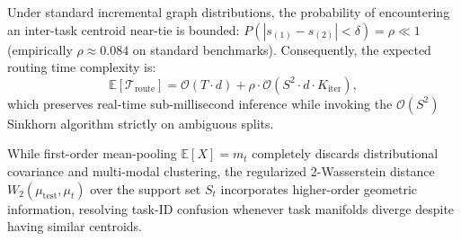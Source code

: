 \begin{remark}
Under standard incremental graph distributions, the probability of encountering an inter-task centroid near-tie is bounded: $P(|s_{(1)} - s_{(2)}| < \delta) = \rho \ll 1$ (empirically $\rho \approx 0.084$ on standard benchmarks). Consequently, the expected routing time complexity is:
\begin{equation}
    \mathbb{E}[\mathcal{T}_{\mathrm{route}}] = \mathcal{O}(T \cdot d) + \rho \cdot \mathcal{O}(S^2 \cdot d \cdot K_{\mathrm{iter}}),
\end{equation}
which preserves real-time sub-millisecond inference while invoking the $\mathcal{O}(S^2)$ Sinkhorn algorithm strictly on ambiguous splits.
\end{remark}

\begin{remark}
While first-order mean-pooling $\mathbb{E}[X] = m_t$ completely discards distributional covariance and multi-modal clustering, the regularized 2-Wasserstein distance $W_2(\mu_{\mathrm{test}}, \mu_t)$ over the support set $S_t$ incorporates higher-order geometric information, resolving task-ID confusion whenever task manifolds diverge despite having similar centroids.
\end{remark}

